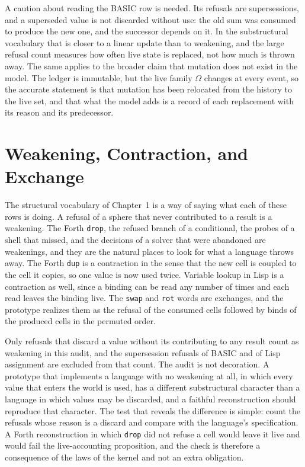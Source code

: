 \documentclass[11pt,oneside]{report}
\theoremstyle{plain}
\theoremstyle{definition}
\theoremstyle{remark}
\begin{document}
A caution about reading the BASIC row is needed. Its refusals are supersessions, and a superseded value is not discarded without use: the old sum was consumed to produce the new one, and the successor depends on it. In the substructural vocabulary that is closer to a linear update than to weakening, and the large refusal count measures how often live state is replaced, not how much is thrown away. The same applies to the broader claim that mutation does not exist in the model. The ledger is immutable, but the live family $\Omega$ changes at every event, so the accurate statement is that mutation has been relocated from the history to the live set, and that what the model adds is a record of each replacement with its reason and its predecessor.

\section{Weakening, Contraction, and Exchange}

The structural vocabulary of Chapter~1 is a way of saying what each of these rows is doing. A refusal of a sphere that never contributed to a result is a weakening. The Forth \texttt{drop}, the refused branch of a conditional, the probes of a shell that missed, and the decisions of a solver that were abandoned are weakenings, and they are the natural places to look for what a language throws away. The Forth \texttt{dup} is a contraction in the sense that the new cell is coupled to the cell it copies, so one value is now used twice. Variable lookup in Lisp is a contraction as well, since a binding can be read any number of times and each read leaves the binding live. The \texttt{swap} and \texttt{rot} words are exchanges, and the prototype realizes them as the refusal of the consumed cells followed by binds of the produced cells in the permuted order.

Only refusals that discard a value without its contributing to any result count as weakening in this audit, and the supersession refusals of BASIC and of Lisp assignment are excluded from that count. The audit is not decoration. A prototype that implements a language with no weakening at all, in which every value that enters the world is used, has a different substructural character than a language in which values may be discarded, and a faithful reconstruction should reproduce that character. The test that reveals the difference is simple: count the refusals whose reason is a discard and compare with the language's specification. A Forth reconstruction in which \texttt{drop} did not refuse a cell would leave it live and would fail the live-accounting proposition, and the check is therefore a consequence of the laws of the kernel and not an extra obligation.
\end{document}
